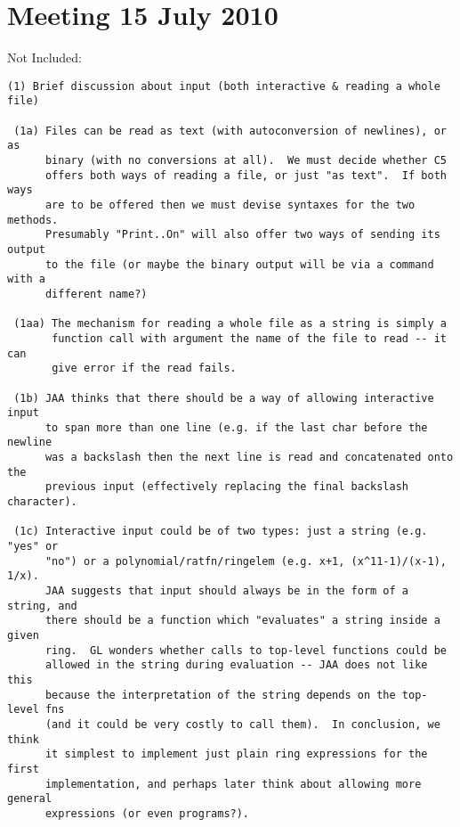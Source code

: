 \documentclass{book}[12,a4paper]
\def\refandpage#1{{\ref{#1}, pg.\pageref{#1}}}
\begin{document}
\section{Meeting 15 July 2010}

Not Included: %
\begin{verbatim}
(1) Brief discussion about input (both interactive & reading a whole file)

 (1a) Files can be read as text (with autoconversion of newlines), or as
      binary (with no conversions at all).  We must decide whether C5
      offers both ways of reading a file, or just "as text".  If both ways
      are to be offered then we must devise syntaxes for the two methods.
      Presumably "Print..On" will also offer two ways of sending its output
      to the file (or maybe the binary output will be via a command with a
      different name?)

 (1aa) The mechanism for reading a whole file as a string is simply a
       function call with argument the name of the file to read -- it can
       give error if the read fails.

 (1b) JAA thinks that there should be a way of allowing interactive input
      to span more than one line (e.g. if the last char before the newline
      was a backslash then the next line is read and concatenated onto the
      previous input (effectively replacing the final backslash character).

 (1c) Interactive input could be of two types: just a string (e.g. "yes" or
      "no") or a polynomial/ratfn/ringelem (e.g. x+1, (x^11-1)/(x-1), 1/x).
      JAA suggests that input should always be in the form of a string, and
      there should be a function which "evaluates" a string inside a given
      ring.  GL wonders whether calls to top-level functions could be
      allowed in the string during evaluation -- JAA does not like this
      because the interpretation of the string depends on the top-level fns
      (and it could be very costly to call them).  In conclusion, we think
      it simplest to implement just plain ring expressions for the first
      implementation, and perhaps later think about allowing more general
      expressions (or even programs?).
\end{verbatim}
\end{document}
